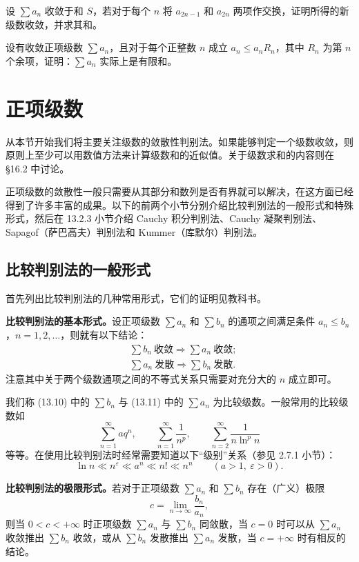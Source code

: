 \begin{xthought}[9]
设 $\sum a_n$ 收敛于和 $S$，若对于每个 $n$ 将 $a_{2n-1}$ 和 $a_{2n}$ 两项作交换，证明所得的新级数收敛，并求其和。
\end{xthought}

\begin{xthought}[10]
设有收敛正项级数 $\sum a_n$，且对于每个正整数 $n$ 成立 $a_n\leq a_nR_n$，其中 $R_n$ 为第 $n$ 个余项，证明：$\sum a_n$ 实际上是有限和。
\end{xthought}

\section{正项级数}

从本节开始我们将主要关注级数的敛散性判别法。如果能够判定一个级数收敛，则原则上至少可以用数值方法来计算级数和的近似值。关于级数求和的内容则在 §16.2 中讨论。

正项级数的敛散性一般只需要从其部分和数列是否有界就可以解决，在这方面已经得到了许多丰富的成果。以下的前两个小节分别介绍比较判别法的一般形式和特殊形式，然后在 13.2.3 小节介绍 Cauchy 积分判别法、Cauchy 凝聚判别法、Sapagof（萨巴高夫）判别法和 Kummer（库默尔）判别法。

\subsection{比较判别法的一般形式}

首先列出比较判别法的几种常用形式，它们的证明见教科书。

\textbf{比较判别法的基本形式。}设正项级数 $\sum a_n$ 和 $\sum b_n$ 的通项之间满足条件 $a_n\leq b_n$，$n=1,2,\ldots$，则就有以下结论：
\begin{align}
&\sum b_n\ \text{收敛}\Longrightarrow\sum a_n\ \text{收敛}; \tag{13.10}\\
&\sum a_n\ \text{发散}\Longrightarrow\sum b_n\ \text{发散}. \tag{13.11}
\end{align}
注意其中关于两个级数通项之间的不等式关系只需要对充分大的 $n$ 成立即可。

我们称 (13.10) 中的 $\sum b_n$ 与 (13.11) 中的 $\sum a_n$ 为比较级数。一般常用的比较级数如
\[
\sum_{n=1}^{\infty}aq^n,\qquad \sum_{n=1}^{\infty}\frac1{n^p},\qquad \sum_{n=2}^{\infty}\frac1{n\ln^p n}
\]
等等。在使用比较判别法时经常需要知道以下“级别”关系（参见 2.7.1 小节）：
\[
\ln n\ll n^\varepsilon\ll a^n\ll n!\ll n^n\qquad(a>1,\ \varepsilon>0).
\]

\textbf{比较判别法的极限形式。}若对于正项级数 $\sum a_n$ 和 $\sum b_n$ 存在（广义）极限
\begin{equation}
c=\lim_{n\to\infty}\frac{b_n}{a_n},
\tag{13.12}
\end{equation}
则当 $0<c<+\infty$ 时正项级数 $\sum a_n$ 与 $\sum b_n$ 同敛散，当 $c=0$ 时可以从 $\sum a_n$ 收敛推出 $\sum b_n$ 收敛，或从 $\sum b_n$ 发散推出 $\sum a_n$ 发散，当 $c=+\infty$ 时有相反的结论。

